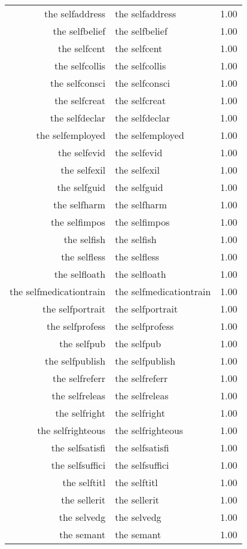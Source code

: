 \begin{table}[ht]
\begin{tabular}{rlr}
  the selfaddress & the selfaddress & 1.00 \\ 
  the selfbelief & the selfbelief & 1.00 \\ 
  the selfcent & the selfcent & 1.00 \\ 
  the selfcollis & the selfcollis & 1.00 \\ 
  the selfconsci & the selfconsci & 1.00 \\ 
  the selfcreat & the selfcreat & 1.00 \\ 
  the selfdeclar & the selfdeclar & 1.00 \\ 
  the selfemployed & the selfemployed & 1.00 \\ 
  the selfevid & the selfevid & 1.00 \\ 
  the selfexil & the selfexil & 1.00 \\ 
  the selfguid & the selfguid & 1.00 \\ 
  the selfharm & the selfharm & 1.00 \\ 
  the selfimpos & the selfimpos & 1.00 \\ 
  the selfish & the selfish & 1.00 \\ 
  the selfless & the selfless & 1.00 \\ 
  the selfloath & the selfloath & 1.00 \\ 
  the selfmedicationtrain & the selfmedicationtrain & 1.00 \\ 
  the selfportrait & the selfportrait & 1.00 \\ 
  the selfprofess & the selfprofess & 1.00 \\ 
  the selfpub & the selfpub & 1.00 \\ 
  the selfpublish & the selfpublish & 1.00 \\ 
  the selfreferr & the selfreferr & 1.00 \\ 
  the selfreleas & the selfreleas & 1.00 \\ 
  the selfright & the selfright & 1.00 \\ 
  the selfrighteous & the selfrighteous & 1.00 \\ 
  the selfsatisfi & the selfsatisfi & 1.00 \\ 
  the selfsuffici & the selfsuffici & 1.00 \\ 
  the selftitl & the selftitl & 1.00 \\ 
  the sellerit & the sellerit & 1.00 \\ 
  the selvedg & the selvedg & 1.00 \\ 
  the semant & the semant & 1.00 \\ 

\end{tabular}
\end{table}
